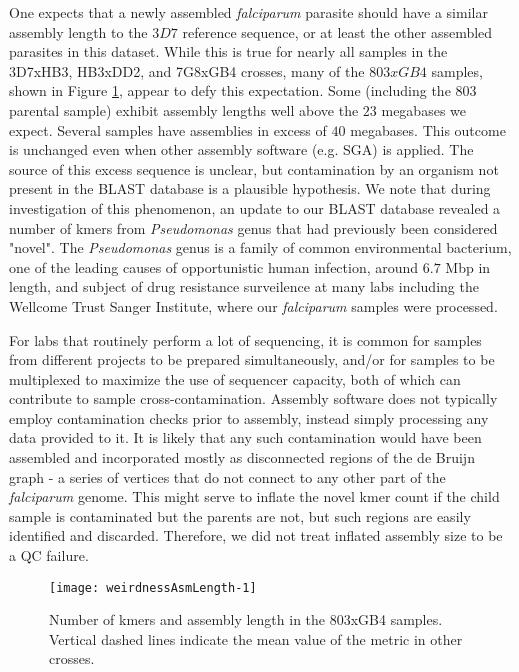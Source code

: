 One expects that a newly assembled \textit{falciparum} parasite should have a similar assembly length to the $3D7$ reference sequence, or at least the other assembled parasites in this dataset.  While this is true for nearly all samples in the 3D7xHB3, HB3xDD2, and 7G8xGB4 crosses, many of the $803xGB4$ samples, shown in Figure \ref{fig:weirdnessAsmLength}, appear to defy this expectation.  Some (including the $803$ parental sample) exhibit assembly lengths well above the $23$ megabases we expect.  Several samples have assemblies in excess of $40$ megabases.  This outcome is unchanged even when other assembly software (e.g. SGA) is applied.  The source of this excess sequence is unclear, but contamination by an organism not present in the BLAST database is a plausible hypothesis.  We note that during investigation of this phenomenon, an update to our BLAST database revealed a number of kmers from \textit{Pseudomonas} genus that had previously been considered "novel".  The \textit{Pseudomonas} genus is a family of common environmental bacterium, one of the leading causes of opportunistic human infection\cite{Stover:2000dy}, around $6.7$ Mbp in length, and subject of drug resistance surveilence\cite{Winsor:2016ca} at many labs including the Wellcome Trust Sanger Institute, where our \textit{falciparum} samples were processed.

For labs that routinely perform a lot of sequencing, it is common for samples from different projects to be prepared simultaneously, and/or for samples to be multiplexed to maximize the use of sequencer capacity, both of which can contribute to sample cross-contamination\cite{Jun:2012je}.  Assembly software does not typically employ contamination checks prior to assembly, instead simply processing any data provided to it.  It is likely that any such contamination would have been assembled and incorporated mostly as disconnected regions of the de Bruijn graph - a series of vertices that do not connect to any other part of the \textit{falciparum} genome.  This might serve to inflate the novel kmer count if the child sample is contaminated but the parents are not, but such regions are easily identified and discarded.  Therefore, we did not treat inflated assembly size to be a QC failure.

\begin{figure}[h!]
  \centering
    \texttt{[image: weirdnessAsmLength-1]}
  \caption{Number of kmers and assembly length in the 803xGB4 samples.  Vertical dashed lines indicate the mean value of the metric in other crosses.}
  \label{fig:weirdnessAsmLength}
\end{figure}

